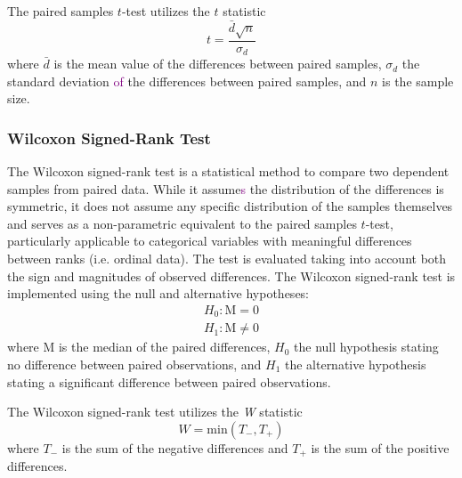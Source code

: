 The paired samples $t$-test utilizes the $t$ statistic
\begin{equation}
	t = \frac{\bar{d}\sqrt{n}}{\sigma_d}
\end{equation}
where $\bar{d}$ is the mean value of the differences between paired samples, $\sigma_d$ the standard deviation \textcolor{purple}{of} the differences between paired samples, and $n$ is the sample size.

\subsubsection{Wilcoxon Signed-Rank Test}
\hfill \break
The Wilcoxon signed-rank test is a statistical method to compare two dependent samples from paired data. While it assume\textcolor{purple}{s} the distribution of the differences is symmetric, it does not assume any specific distribution of the samples themselves and serves as a non-parametric equivalent to the paired samples $t$-test, particularly applicable to categorical variables with meaningful differences between ranks (i.e. ordinal data). The test is evaluated taking into account both the sign and magnitudes of observed differences. The Wilcoxon signed-rank test is implemented using the null and alternative hypotheses:
\begin{equation}
\begin{array}{c}
	H_0: \mathrm{M} = 0   \\
	H_1: \mathrm{M} \neq 0
\end{array}
\end{equation}
where M is the median of the paired differences, $H_0$ the null hypothesis stating no difference between paired observations, and $H_1$ the alternative hypothesis stating a significant difference between paired observations.

The Wilcoxon signed-rank test utilizes the \textit{W} statistic
\begin{equation}
	 W = \mathrm{min}(T_-, T_+)
\end{equation}
where $T_-$ is the sum of the negative differences and $T_+$ is the sum of the positive differences.


